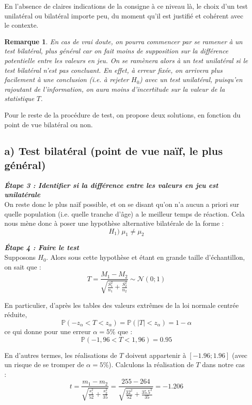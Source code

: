 \documentclass[a4paper,oneside,12pt]{article}
\theoremstyle{plain}
\newtheorem*{remark}{Remarque}
\def\P{{\mathbb P}}
\begin{document}
\noindent En l'absence de claires indications de la consigne à ce niveau là, le choix d'un test unilatéral ou bilatéral importe peu, du moment qu'il est justifié et cohérent avec le contexte. 
    
\begin{remark}
En cas de vrai doute, on pourra commencer par se ramener à un test bilatéral, plus général car on fait moins de supposition sur la différence potentielle entre les valeurs en jeu. On se ramènera alors  à un test unilatéral si le test bilatéral n'est pas concluant. En effet, à erreur fixée, on arrivera plus facilement à une conclusion (i.e. à rejeter $H_0$) avec un test unilatéral, puisqu'en rajoutant de l'information, on aura moins d'incertitude sur la valeur de la statistique $T$.
\end{remark}


\noindent Pour le reste de la procédure de test, on propose deux solutions, en fonction du point de vue bilatéral ou non.
    
\subsection*{a) Test bilatéral (point de vue naïf, le plus général)}
    
    
\textit{\textbf{Étape 3 : Identifier si la différence entre les valeurs en jeu est unilatérale}}\\
On reste donc le plus naïf possible, et on se disant qu'on n'a aucun a priori sur quelle population (i.e. quelle tranche d'âge) a le meilleur temps de réaction. Cela nous mène donc à poser une hypothèse alternative bilatérale de la forme :
$$H_1) \;\mu_1\neq\mu_2$$ 
    
\textit{\textbf{Étape 4 : Faire le test}}\\
Supposons $H_0$. Alors sous cette hypothèse et étant en grande taille d'échantillon, on sait que :
$$ T = \frac{M_1 -M_2}{\sqrt{\frac{S_1^2}{n_1}+\frac{S_2^2}{n_2}}} \sim \mathcal{N}(0;1)$$
    
En particulier, d'après les tables des valeurs extrêmes de la loi normale centrée réduite, 
$$\P(-z_\alpha<T<z_\alpha) = \P(|T|<z_\alpha) = 1-\alpha$$
ce qui donne pour une erreur $\alpha = 5\%$ que :
$$\P(-1,96 < T < 1,96) = 0.95$$
    
En d'autres termes, les réalisations de $T$ doivent appartenir à $[-1.96;1.96]$ (avec un risque de se tromper de $\alpha = 5\%$). Calculons la réalisation de $T$ dans notre cas :
$$ t = \frac{m_1 -m_2}{\sqrt{\frac{s_1^2}{52}+\frac{s_2^2}{35}}} =  \frac{255 -264}{\sqrt{\frac{32^2}{52}+\frac{35.5^2}{35}}} = -1.206$$
    
\end{document}
